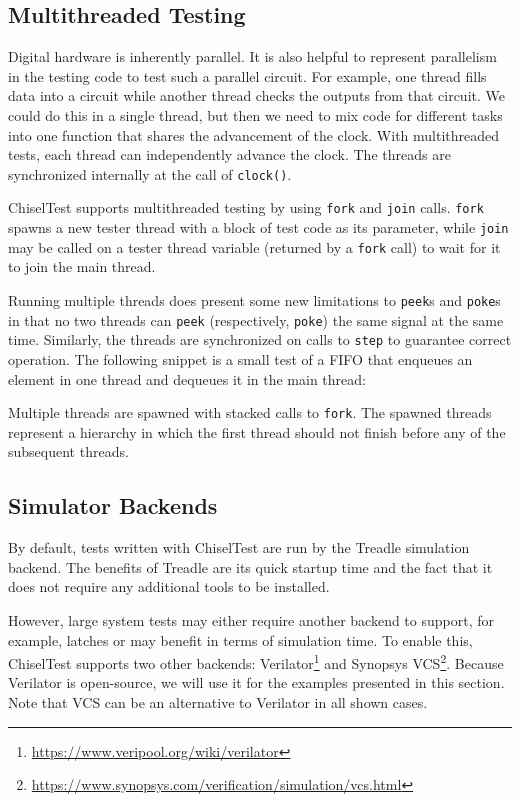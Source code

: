 \documentclass[%
    10pt,
    headinclude, footexclude,
    openright, %
    notitlepage,
    cleardoubleempty,
    headsepline,
    pointlessnumbers,
    bibtotoc, idxtotoc,
    ]{scrbook}
\newcommand{\code}[1]{{\lstinline[basicstyle=\small\ttfamily]{#1}}}
\newcommand{\myref}[2]{\href{#1}{#2}}
\renewcommand{\myref}[2]{{#2}{\footnote{\url{#1}}}}
\begin{document}
\subsection{Multithreaded Testing}

Digital hardware is inherently parallel.
It is also helpful to represent parallelism in the testing code to test such a parallel circuit.
For example, one thread fills data into a circuit while another thread checks the outputs from that circuit.
We could do this in a single thread, but then we need to mix code for different tasks
into one function that shares the advancement of the clock.
With multithreaded tests, each thread can independently advance the clock.
The threads are synchronized internally at the call of \code{clock()}.

ChiselTest supports multithreaded testing by using \code{fork} and
\code{join} calls. \code{fork} spawns a new tester thread with a block of test code
as its parameter, while \code{join} may be called on a tester thread variable
(returned by a \code{fork} call) to wait for it to join the main thread.

Running multiple threads does present some new limitations to \code{peek}s and
\code{poke}s in that no two threads can \code{peek} (respectively, \code{poke}) the
same signal at the same time. Similarly, the threads
are synchronized on calls to \code{step} to guarantee correct operation.
The following snippet is a small test of a FIFO that enqueues an element in one thread
and dequeues it in the main thread:


Multiple threads are spawned with stacked calls to \code{fork}. The spawned threads
represent a hierarchy in which the first thread should not finish before any of the
subsequent threads.

\subsection{Simulator Backends}

By default, tests written with ChiselTest are run by the Treadle simulation backend.
The benefits of Treadle are its quick startup time and the fact that it does not require any additional tools to be installed.

However, large system tests may either require another backend to support, for example, latches or may
benefit in terms of simulation time. To enable this, ChiselTest supports two other backends:
\myref{https://www.veripool.org/wiki/verilator}{Verilator} and
\myref{https://www.synopsys.com/verification/simulation/vcs.html}{Synopsys VCS}.
Because Verilator is open-source, we will use it for the examples presented in this section.
Note that VCS can be an alternative to Verilator in all shown cases.
\end{document}
